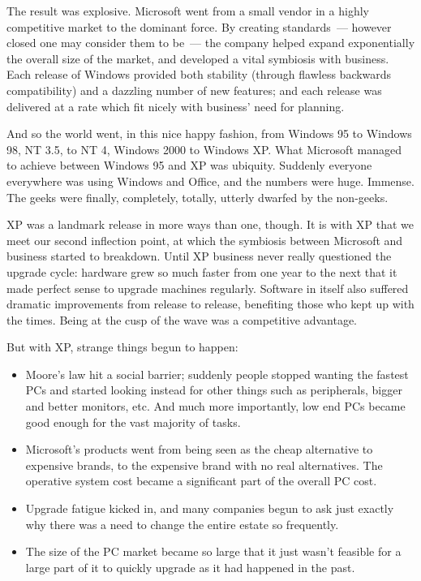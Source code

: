 \documentclass{memoir}
\begin{document}
The result was explosive. Microsoft went from a small vendor in a
highly competitive market to the dominant force. By creating
standards~--- however closed one may consider them to be~--- the
company helped expand exponentially the overall size of the market,
and developed a vital symbiosis with business. Each release of Windows
provided both stability (through flawless backwards compatibility) and
a dazzling number of new features; and each release was delivered at a
rate which fit nicely with business' need for planning.

And so the world went, in this nice happy fashion, from Windows 95 to
Windows 98, NT 3.5, to NT 4, Windows 2000 to Windows XP. What
Microsoft managed to achieve between Windows 95 and XP was
ubiquity. Suddenly everyone everywhere was using Windows and Office,
and the numbers were huge. Immense. The geeks were finally,
completely, totally, utterly dwarfed by the non-geeks.

XP was a landmark release in more ways than one, though. It is with XP
that we meet our second inflection point, at which the symbiosis
between Microsoft and business started to breakdown. Until XP business
never really questioned the upgrade cycle: hardware grew so much
faster from one year to the next that it made perfect sense to upgrade
machines regularly. Software in itself also suffered dramatic
improvements from release to release, benefiting those who kept up
with the times. Being at the cusp of the wave was a competitive
advantage.

But with XP, strange things begun to happen:

\begin{itemize}
\item Moore's law hit a social barrier; suddenly people stopped
  wanting the fastest PCs and started looking instead for other things
  such as peripherals, bigger and better monitors, etc. And much more
  importantly, low end PCs became good enough for the vast majority of
  tasks.
\item Microsoft's products went from being seen as the cheap
  alternative to expensive brands, to the expensive brand with no real
  alternatives. The operative system cost became a significant part of
  the overall PC cost.
\item Upgrade fatigue kicked in, and many companies begun to ask just
  exactly why there was a need to change the entire estate so
  frequently.
\item The size of the PC market became so large that it just wasn't
  feasible for a large part of it to quickly upgrade as it had
  happened in the past.
\end{itemize}
\end{document}
